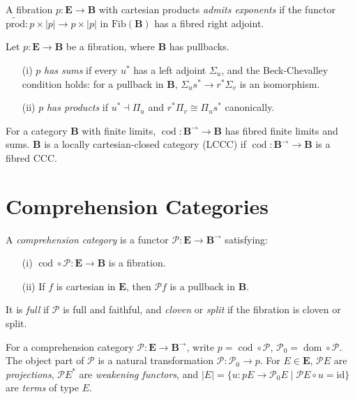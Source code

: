 \documentclass{article}
\begin{document}
\begin{definition}
\label{def:3.9}
A fibration $p : \mathbf{E} \to \mathbf{B}$ with cartesian products \emph{admits exponents} if the functor $\widetilde{\text{prod}} : p \times |p| \to p \times |p|$ in $\text{Fib}(\mathbf{B})$ has a fibred right adjoint.
\end{definition}

\begin{definition}
\label{def:3.10}
Let $p : \mathbf{E} \to \mathbf{B}$ be a fibration, where $\mathbf{B}$ has pullbacks.
\begin{enumerate}
    \item[(i)] $p$ \emph{has sums} if every $u^*$ has a left adjoint $\Sigma_u$, and the Beck-Chevalley condition holds: for a pullback in $\mathbf{B}$, $\Sigma_u s^* \to r^* \Sigma_v$ is an isomorphism.
    \item[(ii)] $p$ \emph{has products} if $u^* \dashv \Pi_u$ and $r^* \Pi_v \cong \Pi_u s^*$ canonically.
\end{enumerate}
\end{definition}

For a category $\mathbf{B}$ with finite limits, $\operatorname{cod} : \mathbf{B}^{\to} \to \mathbf{B}$ has fibred finite limits and sums. $\mathbf{B}$ is a locally cartesian-closed category (LCCC) if $\operatorname{cod} : \mathbf{B}^{\to} \to \mathbf{B}$ is a fibred CCC.

\section{Comprehension Categories}
\label{sec:comprehension-categories}

\begin{definition}
\label{def:4.1}
A \emph{comprehension category} is a functor $\mathscr{P} : \mathbf{E} \to \mathbf{B}^{\to}$ satisfying:
\begin{enumerate}
    \item[(i)] $\operatorname{cod} \circ \mathscr{P} : \mathbf{E} \to \mathbf{B}$ is a fibration.
    \item[(ii)] If $f$ is cartesian in $\mathbf{E}$, then $\mathscr{P} f$ is a pullback in $\mathbf{B}$.
\end{enumerate}
It is \emph{full} if $\mathscr{P}$ is full and faithful, and \emph{cloven} or \emph{split} if the fibration is cloven or split.
\end{definition}

\begin{notation}
\label{not:4.2}
For a comprehension category $\mathscr{P} : \mathbf{E} \to \mathbf{B}^{\to}$, write $p = \operatorname{cod} \circ \mathscr{P}$, $\mathscr{P}_0 = \operatorname{dom} \circ \mathscr{P}$. The object part of $\mathscr{P}$ is a natural transformation $\mathscr{P} : \mathscr{P}_0 \to p$. For $E \in \mathbf{E}$, $\mathscr{P} E$ are \emph{projections}, $\mathscr{P} E^*$ are \emph{weakening functors}, and $|E| = \{ u : p E \to \mathscr{P}_0 E \mid \mathscr{P} E \circ u = \text{id} \}$ are \emph{terms} of type $E$.
\end{notation}
\end{document}
